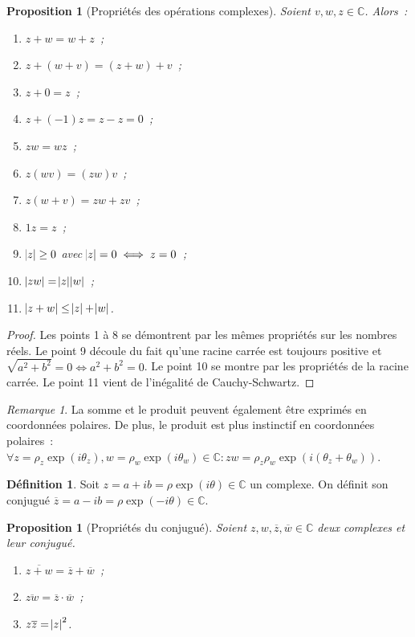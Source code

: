 \documentclass{article}
\newcommand{\C}{\mathbb C}
\newtheorem{prp}[thm]{Proposition}
\theoremstyle{definition}
\newtheorem{déf}[thm]{Définition}
\theoremstyle{remark}
\newtheorem*{rmq}{Remarque}
\begin{document}
		\begin{prp}[Propriétés des opérations complexes] Soient $v, w, z \in \C$. Alors~:
		\begin{enumerate}
			\item $z+w = w+z$~;
			\item $z+(w+v)=(z+w)+v$~;
			\item $z+0 = z$~;
			\item $z + (-1)z = z - z = 0$~;
			\item $zw = wz$~;
			\item $z(wv) = (zw)v$~;
			\item $z(w+v) = zw + zv$~;
			\item $1z = z$~;
			\item $\abs{z} \geq 0$ avec $\abs z = 0 \iff z = 0$~;
			\item $\abs{zw}  = \abs z\abs w$~;
			\item $\abs{z+w} \leq \abs z + \abs w$.
		\end{enumerate}
		\end{prp}

		\begin{proof} Les points 1 à 8 se démontrent par les mêmes propriétés sur les nombres réels. Le point 9 découle du fait qu'une racine carrée est toujours positive
		et $\sqrt {a^2+b^2} = 0 \iff a^2+b^2 = 0$. Le point 10 se montre par les propriétés de la racine carrée. Le point 11 vient de l'inégalité de Cauchy-Schwartz.
		\end{proof}

		\begin{rmq} La somme et le produit peuvent également être exprimés en coordonnées polaires. De plus, le produit est plus instinctif en coordonnées polaires~:
		$\forall z = \rho_z\exp(i\theta_z), w = \rho_w\exp(i\theta_w) \in \C : zw = \rho_z\rho_w\exp(i(\theta_z+\theta_w))$. \end{rmq}

		\begin{déf} Soit $z = a + ib = \rho\exp(i\theta) \in \C$ un complexe. On définit son conjugué $\overline z = a - ib = \rho\exp(-i\theta) \in \C$. \end{déf}

		\begin{prp}[Propriétés du conjugué] Soient $z, w, \overline z, \overline w \in \C$ deux complexes et leur conjugué.
		\begin{enumerate}
			\item $\overline {z+w} = \overline z + \overline w$~;
			\item $\overline {zw} = \overline z\cdot\overline w$~;
			\item $z\overline z = \abs z^2$.
		\end{enumerate}
		\end{prp}
\end{document}
